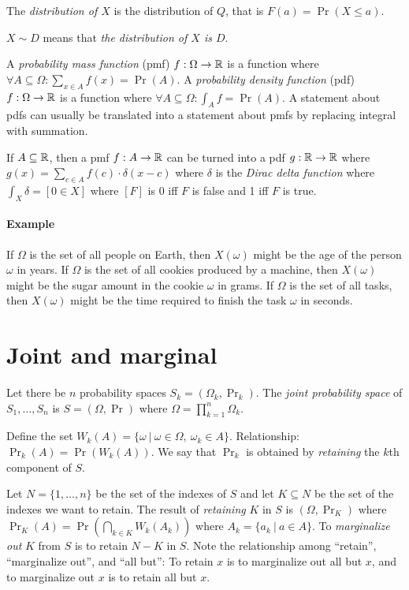 The \emph{distribution of \(X\)} is the distribution of \(Q\),
that is \(F(a) = \Pr(X \le a)\).

\(X \sim D\) means that \emph{the distribution of \(X\) is \(D\)}.

%
A \emph{probability mass function} (pmf) \(f : \Omega \to \mathbb{R}\)
is a function where \(\forall A \subseteq \Omega : \sum_{x \in A} f(x) = \Pr(A)\).
%
A \emph{probability density function} (pdf) \(f : \Omega \to \mathbb{R}\)
is a function where \(\forall A \subseteq \Omega : \int_A f = \Pr(A)\).
A statement about pdfs can usually be translated into
a statement about pmfs by replacing integral with summation.

If \(A \subseteq \mathbb{R}\), then a pmf \(f : A \to \mathbb{R}\)
can be turned into a pdf \(g : \mathbb{R} \to \mathbb{R}\)
where
\(g(x) = \sum_{c \in A} f(c) \cdot \delta(x-c)\)
where
%
%
\(\delta\) is the \emph{Dirac delta function}
where
\( \int_X \delta = [0 \in X] \)
where \([F]\) is 0 iff \(F\) is false and 1 iff \(F\) is true.

\paragraph{Example}
If \(\Omega\) is the set of all people on Earth,
then \(X(\omega)\) might be the age of the person \(\omega\) in years.
If \(\Omega\) is the set of all cookies produced by a machine,
then \(X(\omega)\) might be the sugar amount in the cookie \(\omega\) in grams.
If \(\Omega\) is the set of all tasks,
then \(X(\omega)\) might be the time required to finish the task \(\omega\) in seconds.

\section{Joint and marginal}

%
%
%
Let there be \(n\) probability spaces \(S_k = (\Omega_k,\Pr_k)\).
The \emph{joint probability space} of \(S_1,\ldots,S_n\) is
\(S = (\Omega,\Pr)\)
where \(\Omega = \prod_{k=1}^n \Omega_k\).

Define the set \(W_k(A) = \{ \omega ~|~ \omega \in \Omega, ~ \omega_k \in A \}\).
Relationship: \(\Pr_k(A) = \Pr(W_k(A))\).
We say that \(\Pr_k\) is obtained by \emph{retaining} the \(k\)th component of \(S\).

Let \(N = \{1,\ldots,n\}\) be the set of the indexes of \(S\)
and let \(K \subseteq N\) be the set of the indexes we want to retain.
The result of
%
\emph{retaining} \(K\) in \(S\)
is \((\Omega,\Pr_K)\) where
\(\Pr_K(A) = \Pr\left(\bigcap_{k \in K} W_k(A_k)\right)\)
where \(A_k = \{ a_k ~|~ a \in A \} \).
%
To \emph{marginalize out} \(K\) from \(S\) is to retain \(N-K\) in \(S\).
Note the relationship among ``retain'', ``marginalize out'', and ``all but'':
To retain \(x\) is to marginalize out all but \(x\),
and to marginalize out \(x\) is to retain all but \(x\).

